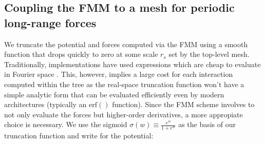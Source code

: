 \subsection{Coupling the FMM to a mesh for periodic long-range forces}
\label{ssec:mesh_summary}

We truncate the potential and forces computed via the FMM using a
smooth function that drops quickly to zero at some scale $r_s$ set by
the top-level mesh. Traditionally, implementations have used
expressions which are cheap to evaluate in Fourier space
\citep[e.g.][]{Bagla2003, Springel2005}. This, however, implies a
large cost for each interaction computed within the tree as the
real-space truncation function won't have a simple analytic form that
can be evaluated efficiently even by modern architectures (typically
an $\mathrm{erf}()$ function). Since the FMM scheme involves to not
only evaluate the forces but higher-order derivatives, a more
appropiate choice is necessary. We use the sigmoid
$\sigma(w) \equiv \frac{e^w}{1 + e^w}$ as the basis of our truncation
function and write for the potential:

